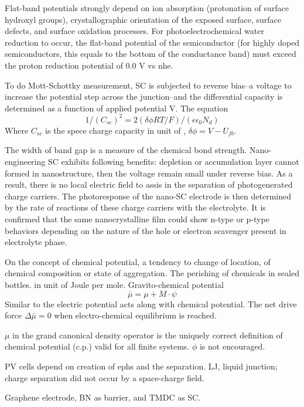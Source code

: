 Flat-band potentials strongly depend on ion absorption (protonation of surface hydroxyl groups), crystallographic orientation of the exposed surface, surface defects, and surface oxidation processes.\cite{Osterloh2008} For photoelectrochemical water reduction to occur, the flat-band potential of the semiconductor (for highly doped semiconductors, this equals to the bottom of the conductance band) must exceed the proton reduction potential of 0.0 V vs \gls{nhe}.

To do Mott-Schottky measurement, SC is subjected to reverse bias--a voltage to increase the potential step across the junction--and the differential capacity is determined as a function of applied potential V. The equation
\[
1/(C_{sc})^2 = 2(\delta\phi RT/F)/(\epsilon\epsilon_0 N_d)
\]
Where $C_{sc}$ is the spece charge capacity in unit of , $\delta\phi = V - U_{fb}$.

The width of band gap is a measure of the chemical bond strength.\cite{Gratzel2001} Nano-engineering SC exhibits following benefits: 
depletion or accumulation layer cannot formed in nanostructure, then the voltage remain small under reverse bias. As a result, there is no local electric field to assis in the separation of photogenerated charge carriers. The photoresponse of the nano-SC electrode is then determined by the rate of reactions of these charge carriers with the electrolyte. It is confirmed that the same nanocrystalline film could show n-type or p-type behaviors depending on the nature of the hole or electron scavenger present in electrolyte phase.\cite{Hodes1992}


On the concept of chemical potential, a tendency to change of location, of chemical composition or state of aggregation.\cite{Job2006} The perishing of chemicals in sealed bottles. in unit of Joule per mole. Gravito-chemical potential 
\[
\bar{\mu} = \mu + M\cdot\psi
\]
Similar to the electric potential acts along with chemical potential. 
The net drive force $\Delta\bar{\mu} = 0$ when electro-chemical equilibrium is reached. 

$\mu$ in the grand canonical density operator is the uniquely correct definition of chemical potential (c.p.) valid for all finite systems.\cite{Kaplan2006} $\phi$ is not encouraged. 

PV cells depend on creation of ephs and the separation.\cite{Hodes1992} LJ, liquid junction; charge separation did not occur by a space-charge field. 


Graphene electrode, BN as barrier, and TMDC as SC.\cite{Withers2015} 

